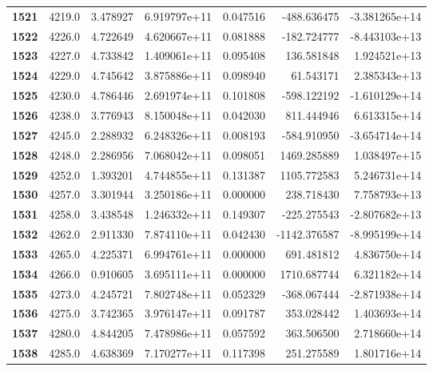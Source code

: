 \documentclass{report}[12pt]
\begin{document}
\begin{center}
\begin{tabular}{lrrrrrr}
\textbf{1521} &         4219.0 &   3.478927 &  6.919797e+11 &    0.047516 &  -488.636475 & -3.381265e+14 \\
\textbf{1522} &         4226.0 &   4.722649 &  4.620667e+11 &    0.081888 &  -182.724777 & -8.443103e+13 \\
\textbf{1523} &         4227.0 &   4.733842 &  1.409061e+11 &    0.095408 &   136.581848 &  1.924521e+13 \\
\textbf{1524} &         4229.0 &   4.745642 &  3.875886e+11 &    0.098940 &    61.543171 &  2.385343e+13 \\
\textbf{1525} &         4230.0 &   4.786446 &  2.691974e+11 &    0.101808 &  -598.122192 & -1.610129e+14 \\
\textbf{1526} &         4238.0 &   3.776943 &  8.150048e+11 &    0.042030 &   811.444946 &  6.613315e+14 \\
\textbf{1527} &         4245.0 &   2.288932 &  6.248326e+11 &    0.008193 &  -584.910950 & -3.654714e+14 \\
\textbf{1528} &         4248.0 &   2.286956 &  7.068042e+11 &    0.098051 &  1469.285889 &  1.038497e+15 \\
\textbf{1529} &         4252.0 &   1.393201 &  4.744855e+11 &    0.131387 &  1105.772583 &  5.246731e+14 \\
\textbf{1530} &         4257.0 &   3.301944 &  3.250186e+11 &    0.000000 &   238.718430 &  7.758793e+13 \\
\textbf{1531} &         4258.0 &   3.438548 &  1.246332e+11 &    0.149307 &  -225.275543 & -2.807682e+13 \\
\textbf{1532} &         4262.0 &   2.911330 &  7.874110e+11 &    0.042430 & -1142.376587 & -8.995199e+14 \\
\textbf{1533} &         4265.0 &   4.225371 &  6.994761e+11 &    0.000000 &   691.481812 &  4.836750e+14 \\
\textbf{1534} &         4266.0 &   0.910605 &  3.695111e+11 &    0.000000 &  1710.687744 &  6.321182e+14 \\
\textbf{1535} &         4273.0 &   4.245721 &  7.802748e+11 &    0.052329 &  -368.067444 & -2.871938e+14 \\
\textbf{1536} &         4275.0 &   3.742365 &  3.976147e+11 &    0.091787 &   353.028442 &  1.403693e+14 \\
\textbf{1537} &         4280.0 &   4.844205 &  7.478986e+11 &    0.057592 &   363.506500 &  2.718660e+14 \\
\textbf{1538} &         4285.0 &   4.638369 &  7.170277e+11 &    0.117398 &   251.275589 &  1.801716e+14 \\

\end{tabular}
\end{center}
\end{document}
